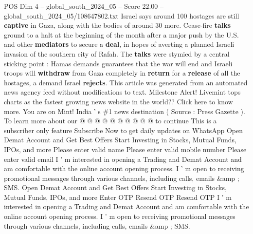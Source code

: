 \begin{textsample}{POS Dim 4 – global\_south\_2024\_05 – Score 22.00 – global\_south\_2024\_05/108647802.txt}
Israel says around 100 hostages are still \textbf{captive} in Gaza, along with the bodies of around 30 more.
Cease-fire \textbf{talks} ground to a halt at the beginning of the month after a major push by the U.S. and other \textbf{mediators} to secure a \textbf{deal}, in hopes of averting a planned Israeli invasion of the southern city of Rafah.
The \textbf{talks} were stymied by a central sticking point : Hamas demands guarantees that the war will end and Israeli troops will \textbf{withdraw} from Gaza completely in \textbf{return} for a \textbf{release} of all the hostages, a demand Israel \textbf{rejects}.
This article was generated from an automated news agency feed without modifications to text.
Milestone Alert!
Livemint tops charts as the fastest growing news website in the world??
Click here to know more.
You are on Mint!
India ' s \#1 news destination ( Source : Press Gazette ).
To learn more about our @ @ @ @ @ @ @ @ @ @ to continue This is a subscriber only feature Subscribe Now to get daily updates on WhatsApp Open Demat Account and Get Best Offers Start Investing in Stocks, Mutual Funds, IPOs, and more Please enter valid name Please enter valid mobile number Please enter valid email I ' m interested in opening a Trading and Demat Account and am comfortable with the online account opening process.
I ' m open to receiving promotional messages through various channels, including calls, emails \&amp ; SMS.
Open Demat Account and Get Best Offers Start Investing in Stocks, Mutual Funds, IPOs, and more Enter OTP Resend OTP Resend OTP I ' m interested in opening a Trading and Demat Account and am comfortable with the online account opening process.
I ' m open to receiving promotional messages through various channels, including calls, emails \&amp ; SMS.

\end{textsample}
